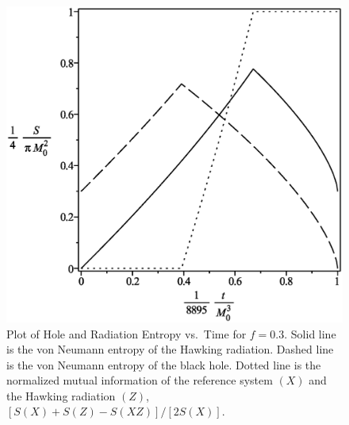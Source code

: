 \documentclass[12pt]{article}
\begin{document}
\begin{figure}[H]
\centering
\includegraphics[width=1\textwidth]{Hawking-hole-radiation-mutual-entropy-vs-time-graph-10f-is-3.eps}
\caption{Plot of Hole and Radiation Entropy vs.\ Time for $f=0.3$.
Solid line is the von Neumann entropy of the Hawking radiation.
Dashed line is the von Neumann entropy of the black hole.
Dotted line is the normalized mutual information of the reference system $(X)$ and the Hawking radiation $(Z)$, $[S(X)+S(Z)-S(XZ)]/[2S(X)]$.}
\end{figure}
\end{document}
